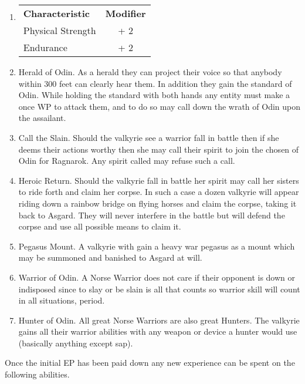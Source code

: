 \documentclass[a4paper]{article}
\begin{document}
\begin{multicols*}{3}
\begin{enumerate}
\item
\begin{tabularx}{\linewidth}{Xc}
\textbf{Characteristic} & \textbf{Modifier} \\
Physical Strength	& + 2 \\
Endurance		& + 2 \\
\end{tabularx}

\item Herald of Odin. As a herald they can project their voice so that
anybody within 300 feet can clearly hear them.  In addition they gain
the standard of Odin.  While holding the standard with both hands any
entity must make a once WP to attack them, and to do so may call down
the wrath of Odin upon the assailant.

\item Call the Slain.  Should the valkyrie see a warrior fall in
battle then if she deems their actions worthy then she may call their
spirit to join the chosen of Odin for Ragnarok.  Any spirit called may
refuse such a call.

\item Heroic Return.  Should the valkyrie fall in battle her spirit
may call her sisters to ride forth and claim her corpse.  In such a
case a dozen valkyrie will appear riding down a rainbow bridge on
flying horses and claim the corpse, taking it back to Asgard.  They
will never interfere in the battle but will defend the corpse and use
all possible means to claim it.

\item Pegasus Mount.  A valkyrie with gain a heavy war pegasus as a
mount which may be summoned and banished to Asgard at will.

\item Warrior of Odin.  A Norse Warrior does not care if their
opponent is down or indisposed since to slay or be slain is all that
counts so warrior skill will count in all situations, period.

\item Hunter of Odin.  All great Norse Warriors are also great
Hunters.  The valkyrie gains all their warrior abilities with any
weapon or device a hunter would use (basically anything except sap).

\end{enumerate}

Once the initial EP has been paid down any new experience can be
spent on the following abilities.


\end{multicols*}
\end{document}
